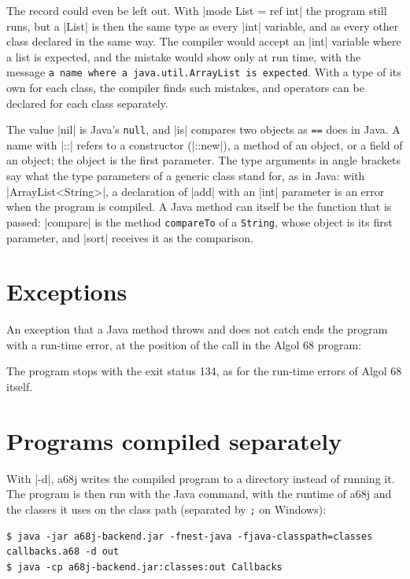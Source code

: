 The record could even be left out. With \code|mode List = ref int| the
program still runs, but a \code|List| is then the same type as every
\code|int| variable, and as every other class declared in the same way.
The compiler would accept an \code|int| variable where a list is
expected, and the mistake would show only at run time, with the message
\texttt{a name where a java.util.ArrayList is expected}. With a type of
its own for each class, the compiler finds such mistakes, and operators
can be declared for each class separately.

The value \code|nil| is Java's \texttt{null}, and \code|is| compares two
objects as \texttt{==} does in Java. A name with \code|::| refers to a constructor (\code|::new|), a
method of an object, or a field of an object; the object is the first
parameter. The type arguments in angle brackets say what the type
parameters of a generic class stand for, as in Java: with
\code|ArrayList<String>|, a declaration of \code|add| with an \code|int|
parameter is an error when the program is compiled. A Java method can
itself be the function that is passed: \code|compare| is the method
\texttt{compareTo} of a \texttt{String}, whose object is its first
parameter, and \code|sort| receives it as the comparison.

\section*{Exceptions}

An exception that a Java method throws and does not catch ends the
program with a run-time error, at the position of the call in the Algol
68 program:


\noindent The program stops with the exit status 134, as for the
run-time errors of Algol 68 itself.

\section*{Programs compiled separately}

With \code|-d|, a68j writes the compiled program to a directory instead
of running it. The program is then run with the Java command, with the
runtime of a68j and the classes it uses on the class path (separated by
\texttt{;} on Windows):
\begin{lstlisting}[style=shell]
$ java -jar a68j-backend.jar -fnest-java -fjava-classpath=classes callbacks.a68 -d out
$ java -cp a68j-backend.jar:classes:out Callbacks
\end{lstlisting}

